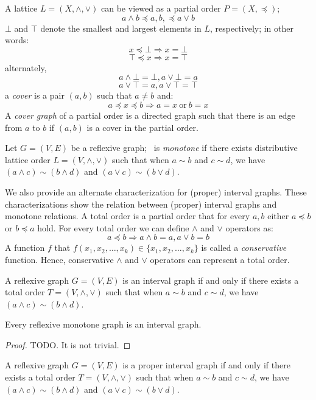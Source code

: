 A lattice \(L=(X,\wedge,\vee)\) can be viewed as a partial order \(P=(X,\preceq)\);
\[ a\wedge b \preceq a,b, \preceq a\vee b\]
\(\bot\) and \(\top\) denote the smallest and largest elements in \(L\), respectively; in other words:
\[x \preceq \bot \Rightarrow x = \bot \]
\[\top \preceq x \Rightarrow x = \top \]
alternately,
\[a \wedge \bot = \bot, a \vee \bot = a\]
\[a \vee \top = a, a \vee \top = \top\]
a \emph{cover} is a pair \((a,b)\) such that \(a \neq b\) and:
\[a \preceq x \preceq b \Rightarrow a = x\ \mathrm{or}\ b = x\]
A \emph{cover graph} of a partial order is a directed graph such that there is
an edge from \(a\) to \(b\) if \((a,b)\) is a cover in the partial order.


\begin{defi} 
Let \(G=(V,E)\) be a reflexive graph; \mG\ is \emph{monotone} if there exists distributive lattice order
\(L=(V, \wedge, \vee)\) such that
when \(a\sim b\) and \(c \sim d\), we have \((a \wedge c) \sim (b \wedge d)\) and \((a \vee c) \sim (b \vee d)\)\@.
\end{defi}

We also provide an alternate characterization for (proper) interval graphs.
These characterizations show the relation between (proper) interval graphs and monotone relations. 
A total order is a partial order that for every \(a, b\) either \(a \preceq b\)
or \(b \preceq a\) hold. For every total order we can define \(\wedge\) and \(\vee\) operators as:
\[a \preceq b \Rightarrow a \wedge b = a, a \vee b = b\]
A function \(f\) that \(f(x_1,x_2,\dotsc,x_k)\in \{x_1,x_2,\dotsc,x_k\}\) is called
a \emph{conservative} function. Hence, conservative \(\wedge\) and \(\vee\) operators
can represent a total order.

\begin{theorem}[TODO] \label{thm:semimin}
A reflexive graph \(G=(V,E)\) is an interval graph if and only if there exists
a total order \(T=(V,\wedge,\vee)\) such that
when \(a\sim b\) and \(c \sim d\), we have \((a \wedge c) \sim (b \wedge d)\)\@.
\end{theorem}

\begin{lemma} \label{lem:intmon}
Every reflexive monotone graph is an interval graph.
\end{lemma}

\begin{proof}
TODO. It is not trivial.
\end{proof}

\begin{theorem} [TODO] \label{thm:minmax}
A reflexive graph \(G=(V,E)\) is a proper interval graph if and only if there exists
a total order \(T=(V,\wedge,\vee)\) such that
when \(a\sim b\) and \(c \sim d\), we have \((a \wedge c) \sim (b \wedge d)\) and \((a \vee c) \sim (b \vee d)\)\@.
\end{theorem}

